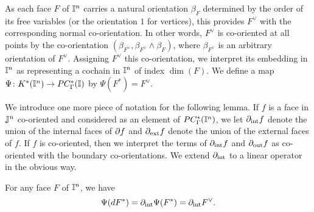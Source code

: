 As each face $F$ of $\mathbb{I}^n$ carries a natural orientation $\beta_F$ determined by the order of its free variables (or the orientation $1$ for vertices), this provides $F^\vee$ with the corresponding normal co-orientation.
In other words, $F^\vee$ is co-oriented at all points by the co-orientation $(\beta_{F^\vee}, \beta_{F^\vee} \wedge \beta_F)$, where $\beta_{F^\vee}$ is an arbitrary orientation of $F^\vee$.
Assigning $F^\vee$ this co-orientation, we interpret its embedding in $\mathbb{I}^n$ as representing a cochain in $\mathbb{I}^n$ of index $\dim(F)$.
We define a map $\Psi \colon K^*(\mathbb{I}^n) \to PC_\Gamma^*(\mathbb{I})$ by $\Psi(F^*) = F^\vee$.

We introduce one more piece of notation for the following lemma.
If $f$ is a face in $\mathbb{J}^n$ co-oriented and considered as an element of $PC^*_\Gamma(\mathbb{I}^n)$, we let $\partial_{\text{int}}f$ denote the union of the internal faces of $\partial f$ and $\partial_{\text{ext}}f$ denote the union of the external faces of $f$.
If $f$ is co-oriented, then we interpret the terms of $\partial_{\text{int}}f$ and $\partial_{\text{out}}f$ as co-oriented with the boundary co-orientations.
We extend $\partial_{\text{int}}$ to a linear operator in the obvious way.

\begin{lemma}\label{L: dualizing bijection}
	For any face $F$ of $\mathbb{I}^n$, we have $$\Psi(d F^*) = \partial_{\text{int}}\Psi(F^*) = \partial_{\text{int}}F^\vee.$$
\end{lemma}

